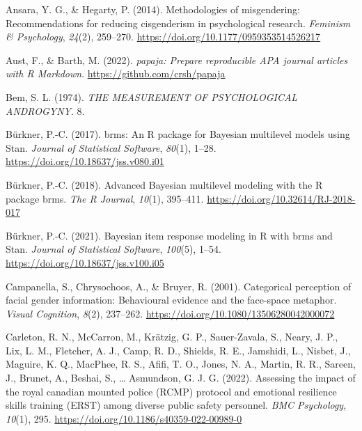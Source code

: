\documentclass[
  man]{apa7}
\newlength{\cslhangindent}
\newlength{\cslentryspacingunit} %
\newenvironment{CSLReferences}[2] %
 {%
  \setlength{\parindent}{0pt}
  \ifodd #1
  \let\oldpar\par
  \def\par{\hangindent=\cslhangindent\oldpar}
  \fi
  \setlength{\parskip}{#2\cslentryspacingunit}
 }%
 {}
\begin{document}
\hypertarget{refs}{}
\begin{CSLReferences}{1}{0}
\leavevmode{}%
Ansara, Y. G., \& Hegarty, P. (2014). Methodologies of misgendering: Recommendations for reducing cisgenderism in psychological research. \emph{Feminism \& Psychology}, \emph{24}(2), 259--270. \url{https://doi.org/10.1177/0959353514526217}

\leavevmode{}%
Aust, F., \& Barth, M. (2022). \emph{{papaja}: {Prepare} reproducible {APA} journal articles with {R Markdown}}. \url{https://github.com/crsh/papaja}

\leavevmode{}%
Bem, S. L. (1974). \emph{{THE} {MEASUREMENT} {OF} {PSYCHOLOGICAL} {ANDROGYNY}}. 8.

\leavevmode{}%
Bürkner, P.-C. (2017). {brms}: An {R} package for {Bayesian} multilevel models using {Stan}. \emph{Journal of Statistical Software}, \emph{80}(1), 1--28. \url{https://doi.org/10.18637/jss.v080.i01}

\leavevmode{}%
Bürkner, P.-C. (2018). Advanced {Bayesian} multilevel modeling with the {R} package {brms}. \emph{The R Journal}, \emph{10}(1), 395--411. \url{https://doi.org/10.32614/RJ-2018-017}

\leavevmode{}%
Bürkner, P.-C. (2021). Bayesian item response modeling in {R} with {brms} and {Stan}. \emph{Journal of Statistical Software}, \emph{100}(5), 1--54. \url{https://doi.org/10.18637/jss.v100.i05}

\leavevmode{}%
Campanella, S., Chrysochoos, A., \& Bruyer, R. (2001). Categorical perception of facial gender information: Behavioural evidence and the face-space metaphor. \emph{Visual Cognition}, \emph{8}(2), 237--262. \url{https://doi.org/10.1080/13506280042000072}

\leavevmode{}%
Carleton, R. N., McCarron, M., Krätzig, G. P., Sauer-Zavala, S., Neary, J. P., Lix, L. M., Fletcher, A. J., Camp, R. D., Shields, R. E., Jamshidi, L., Nisbet, J., Maguire, K. Q., MacPhee, R. S., Afifi, T. O., Jones, N. A., Martin, R. R., Sareen, J., Brunet, A., Beshai, S., \ldots{} Asmundson, G. J. G. (2022). Assessing the impact of the royal canadian mounted police ({RCMP}) protocol and emotional resilience skills training ({ERST}) among diverse public safety personnel. \emph{{BMC} Psychology}, \emph{10}(1), 295. \url{https://doi.org/10.1186/s40359-022-00989-0}


\end{CSLReferences}
\end{document}
